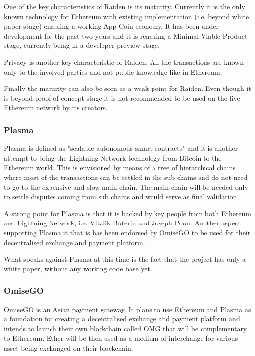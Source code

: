 One of the key characteristics of Raiden is its maturity. Currently it is the only known technology for Ethereum with existing implementation (i.e. beyond white paper stage) enabling a working App Coin economy. It has been under development for the past two years and it is reaching a Minimal Viable Product stage, currently being in a developer preview stage.

Privacy is another key characteristic of Raiden.  All the transactions are known only to the involved parties and not public knowledge like in Ethereum.

Finally the maturity can also be seen as a weak point for Raiden. Even though it is beyond proof-of-concept stage it is not recommended to be used on the live Ethereum network by its creators.

\subsubsection{Plasma}
Plasma is defined as "scalable autonomous smart contracts" \cite{Plasma} and it is another attempt to bring the Lightning Network technology from Bitcoin to the Ethereum world. This is envisioned by means of a tree of hierarchical chains where most of the transactions can be settled in the sub-chains and do not need to go to the expensive and slow main chain. The main chain will be needed only to settle disputes coming from sub chains and would serve as final validation.

A strong point for Plasma is that it is backed by key people from both Ethereum and Lightning Network, i.e. Vitalik Buterin and Joseph Poon. Another aspect supporting Plasma it that is has been endorsed by OmiseGO to be used for their decentralised exchange and payment platform\cite{omisego_plasma}.

What speaks against Plasma at this time is the fact that the project has only a white paper, without any working code base yet.

\subsubsection{OmiseGO}
OmiseGO is an Asian payment gateway. It plans to use Ethereum and Plasma as a foundation for creating a decentralised exchange and payment platform \cite{OMG} and intends to launch their own blockchain called OMG that will be complementary to Ethereum. Ether will be then used as a medium of interchange for various asset being exchanged on their blockchain.

